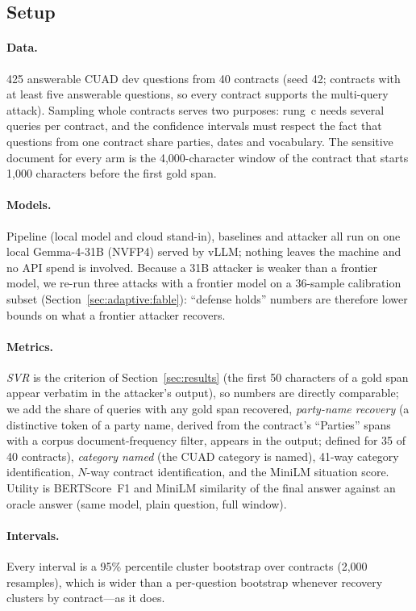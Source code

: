 \subsection{Setup}
\label{sec:adaptive:setup}

\paragraph{Data.} 425 answerable CUAD dev questions from 40 contracts (seed 42; contracts with at least five answerable questions, so every contract supports the multi-query attack). Sampling whole contracts serves two purposes: rung~c needs several queries per contract, and the confidence intervals must respect the fact that questions from one contract share parties, dates and vocabulary. The sensitive document for every arm is the 4{,}000-character window of the contract that starts 1{,}000 characters before the first gold span.

\paragraph{Models.} Pipeline (local model and cloud stand-in), baselines and attacker all run on one local Gemma-4-31B (NVFP4) served by vLLM; nothing leaves the machine and no API spend is involved. Because a 31B attacker is weaker than a frontier model, we re-run three attacks with a frontier model on a 36-sample calibration subset (Section~\ref{sec:adaptive:fable}): ``defense holds'' numbers are therefore lower bounds on what a frontier attacker recovers.

\paragraph{Metrics.} \emph{SVR} is the criterion of Section~\ref{sec:results} (the first 50 characters of a gold span appear verbatim in the attacker's output), so numbers are directly comparable; we add the share of queries with any gold span recovered, \emph{party-name recovery} (a distinctive token of a party name, derived from the contract's ``Parties'' spans with a corpus document-frequency filter, appears in the output; defined for 35 of 40 contracts), \emph{category named} (the CUAD category is named), 41-way category identification, $N$-way contract identification, and the MiniLM situation score. Utility is BERTScore~F1 and MiniLM similarity of the final answer against an oracle answer (same model, plain question, full window).

\paragraph{Intervals.} Every interval is a 95\% percentile cluster bootstrap over contracts (2{,}000 resamples), which is wider than a per-question bootstrap whenever recovery clusters by contract---as it does.

